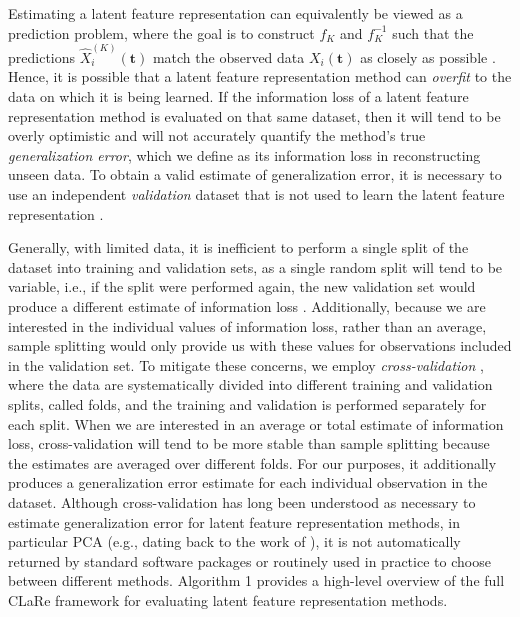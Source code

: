 Estimating a latent feature representation can equivalently be viewed as a prediction problem, where the goal is to construct $f_{K}$ and $f_{K}^{-1}$ such that the predictions $\widehat{X}_i^{(K)}(\mathbf{t})$ match the observed data $X_i(\mathbf{t})$ as closely as possible \parencite{krzanowski_cross-validation_1987, wold_cross-validatory_1978, diana_cross-validation_2002, bro_cross-validation_2008}.
Hence, it is possible that a latent feature representation method can \emph{overfit} to the data on which it is being learned.
If the information loss of a latent feature representation method is evaluated on that same dataset, then it will tend to be overly optimistic and will not accurately quantify the method's true \emph{generalization error}, which we define as its information loss in reconstructing unseen data.
To obtain a valid estimate of generalization error, it is necessary to use an independent \emph{validation} dataset that is not used to learn the latent feature representation \parencite{diana_cross-validation_2002, bro_cross-validation_2008}.


Generally, with limited data, it is inefficient to perform a single split of the dataset into training and validation sets, as a single random split will tend to be variable, i.e., if the split were performed again, the new validation set would produce a different estimate of information loss \parencite[Table 1]{collins_evaluation_2024}.
Additionally, because we are interested in the individual values of information loss, rather than an average, sample splitting would only provide us with these values for observations included in the validation set. 
To mitigate these concerns, we employ \emph{cross-validation} \parencite{stone_cross-validatory_1974}, where the data are systematically divided into different training and validation splits, called folds, and the training and validation is performed separately for each split.
When we are interested in an average or total estimate of information loss, cross-validation will tend to be more stable than sample splitting because the estimates are averaged over different folds.
For our purposes, it additionally produces a generalization error estimate for each individual observation in the dataset.
Although cross-validation has long been understood as necessary to estimate generalization error for latent feature representation methods, in particular PCA (e.g., dating back to the work of \textcite{wold_cross-validatory_1978, eastment_cross-validatory_1982, krzanowski_cross-validation_1987}), it is not automatically returned by standard software packages or routinely used in practice to choose between different methods.
Algorithm 1 provides a high-level overview of the full CLaRe framework for evaluating latent feature representation methods.

